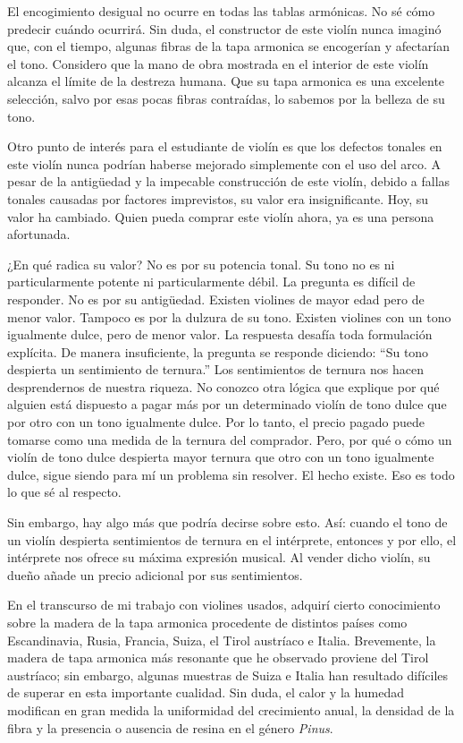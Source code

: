 \documentclass[12pt]{book}
\begin{document}
El encogimiento desigual no ocurre en todas las tablas armónicas. No sé cómo predecir cuándo ocurrirá. Sin duda, el constructor de este violín nunca imaginó que, con el tiempo, algunas fibras de la tapa armonica se encogerían y afectarían el tono. Considero que la mano de obra mostrada en el interior de este violín alcanza el límite de la destreza humana. Que su tapa armonica es una excelente selección, salvo por esas pocas fibras contraídas, lo sabemos por la belleza de su tono.

Otro punto de interés para el estudiante de violín es que los defectos tonales en este violín nunca podrían haberse mejorado simplemente con el uso del arco. A pesar de la antigüedad y la impecable construcción de este violín, debido a fallas tonales causadas por factores imprevistos, su valor era insignificante. Hoy, su valor ha cambiado. Quien pueda comprar este violín ahora, ya es una persona afortunada.

¿En qué radica su valor? No es por su potencia tonal. Su tono no es ni particularmente potente ni particularmente débil. La pregunta es difícil de responder. No es por su antigüedad. Existen violines de mayor edad pero de menor valor. Tampoco es por la dulzura de su tono. Existen violines con un tono igualmente dulce, pero de menor valor. La respuesta desafía toda formulación explícita. De manera insuficiente, la pregunta se responde diciendo: ``Su tono despierta un sentimiento de ternura.'' Los sentimientos de ternura nos hacen desprendernos de nuestra riqueza. No conozco otra lógica que explique por qué alguien está dispuesto a pagar más por un determinado violín de tono dulce que por otro con un tono igualmente dulce. Por lo tanto, el precio pagado puede tomarse como una medida de la ternura del comprador. Pero, por qué o cómo un violín de tono dulce despierta mayor ternura que otro con un tono igualmente dulce, sigue siendo para mí un problema sin resolver. El hecho existe. Eso es todo lo que sé al respecto.

Sin embargo, hay algo más que podría decirse sobre esto. Así: cuando el tono de un violín despierta sentimientos de ternura en el intérprete, entonces y por ello, el intérprete nos ofrece su máxima expresión musical. Al vender dicho violín, su dueño añade un precio adicional por sus sentimientos.

En el transcurso de mi trabajo con violines usados, adquirí cierto conocimiento sobre la madera de la tapa armonica procedente de distintos países como Escandinavia, Rusia, Francia, Suiza, el Tirol austríaco e Italia. Brevemente, la madera de tapa armonica más resonante que he observado proviene del Tirol austríaco; sin embargo, algunas muestras de Suiza e Italia han resultado difíciles de superar en esta importante cualidad. Sin duda, el calor y la humedad modifican en gran medida la uniformidad del crecimiento anual, la densidad de la fibra y la presencia o ausencia de resina en el género \textit{Pinus}. 
\end{document}
